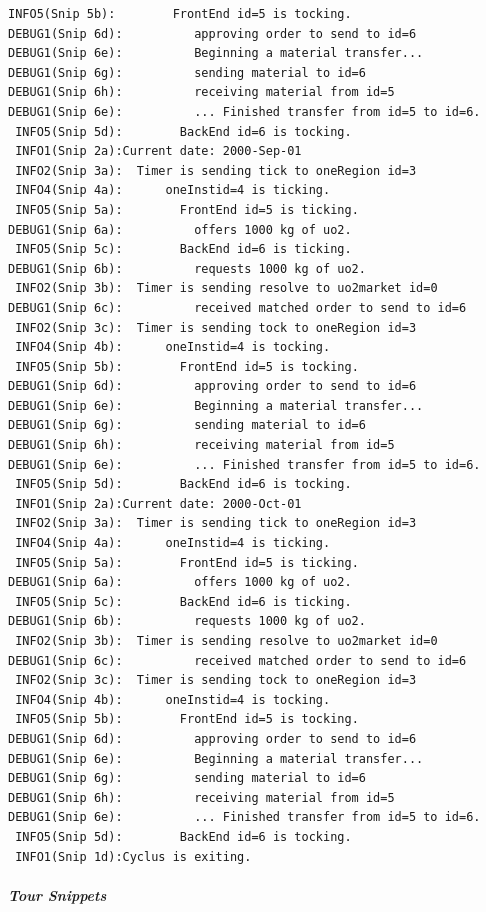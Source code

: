 \documentclass[letterpaper,10pt,english]{sphinxmanual}
\begin{document}
\begin{Verbatim}[commandchars=\\\{\}]
 INFO5(Snip 5b):        FrontEnd id=5 is tocking.
DEBUG1(Snip 6d):          approving order to send to id=6
DEBUG1(Snip 6e):          Beginning a material transfer...
DEBUG1(Snip 6g):          sending material to id=6
DEBUG1(Snip 6h):          receiving material from id=5
DEBUG1(Snip 6e):          ... Finished transfer from id=5 to id=6.
 INFO5(Snip 5d):        BackEnd id=6 is tocking.
 INFO1(Snip 2a):Current date: 2000-Sep-01
 INFO2(Snip 3a):  Timer is sending tick to oneRegion id=3
 INFO4(Snip 4a):      oneInstid=4 is ticking.
 INFO5(Snip 5a):        FrontEnd id=5 is ticking.
DEBUG1(Snip 6a):          offers 1000 kg of uo2.
 INFO5(Snip 5c):        BackEnd id=6 is ticking.
DEBUG1(Snip 6b):          requests 1000 kg of uo2.
 INFO2(Snip 3b):  Timer is sending resolve to uo2market id=0
DEBUG1(Snip 6c):          received matched order to send to id=6
 INFO2(Snip 3c):  Timer is sending tock to oneRegion id=3
 INFO4(Snip 4b):      oneInstid=4 is tocking.
 INFO5(Snip 5b):        FrontEnd id=5 is tocking.
DEBUG1(Snip 6d):          approving order to send to id=6
DEBUG1(Snip 6e):          Beginning a material transfer...
DEBUG1(Snip 6g):          sending material to id=6
DEBUG1(Snip 6h):          receiving material from id=5
DEBUG1(Snip 6e):          ... Finished transfer from id=5 to id=6.
 INFO5(Snip 5d):        BackEnd id=6 is tocking.
 INFO1(Snip 2a):Current date: 2000-Oct-01
 INFO2(Snip 3a):  Timer is sending tick to oneRegion id=3
 INFO4(Snip 4a):      oneInstid=4 is ticking.
 INFO5(Snip 5a):        FrontEnd id=5 is ticking.
DEBUG1(Snip 6a):          offers 1000 kg of uo2.
 INFO5(Snip 5c):        BackEnd id=6 is ticking.
DEBUG1(Snip 6b):          requests 1000 kg of uo2.
 INFO2(Snip 3b):  Timer is sending resolve to uo2market id=0
DEBUG1(Snip 6c):          received matched order to send to id=6
 INFO2(Snip 3c):  Timer is sending tock to oneRegion id=3
 INFO4(Snip 4b):      oneInstid=4 is tocking.
 INFO5(Snip 5b):        FrontEnd id=5 is tocking.
DEBUG1(Snip 6d):          approving order to send to id=6
DEBUG1(Snip 6e):          Beginning a material transfer...
DEBUG1(Snip 6g):          sending material to id=6
DEBUG1(Snip 6h):          receiving material from id=5
DEBUG1(Snip 6e):          ... Finished transfer from id=5 to id=6.
 INFO5(Snip 5d):        BackEnd id=6 is tocking.
 INFO1(Snip 1d):Cyclus is exiting.
\end{Verbatim}


\subparagraph{Tour Snippets}
\label{devdoc/tour_snippets:tour-snippets}\label{devdoc/tour_snippets::doc}
\end{document}
